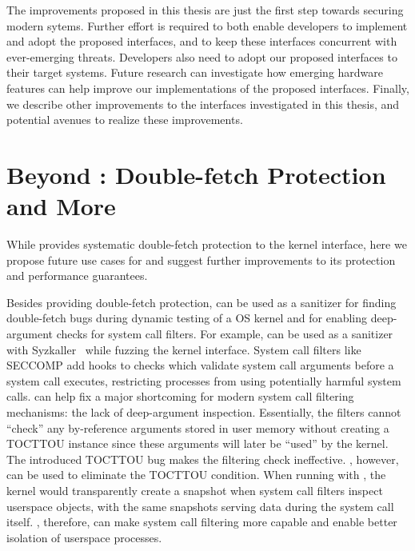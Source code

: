 The improvements proposed in this thesis are just the first step towards
securing modern sytems.
Further effort is required to both enable developers to implement and 
adopt the proposed interfaces, 
and to keep these interfaces concurrent with ever-emerging threats.
Developers also need to adopt our proposed interfaces to their target
systems.
Future research can investigate how emerging hardware features can help 
improve our implementations of the proposed interfaces.
Finally, we describe other improvements to the interfaces investigated
in this thesis, and potential avenues to realize these improvements.

\section{Beyond \midas: Double-fetch Protection and More}
\label{sec:conclusion:midas}
While \midas provides systematic double-fetch protection to the 
kernel interface,
here we propose future use cases for \midas and 
suggest further improvements to its protection and performance 
guarantees.

Besides providing double-fetch protection, \midas can be used as a 
sanitizer for finding double-fetch bugs during dynamic testing of a
OS kernel and for enabling deep-argument checks for system call filters.
For example, \midas can be used as a sanitizer with 
Syzkaller~\cite{vyukov2019syzkaller} while fuzzing the kernel interface.
System call filters like SECCOMP add hooks to checks which validate
system call arguments before a system call executes, 
restricting processes from using potentially harmful system calls.
\midas can help fix a major shortcoming for modern system call
filtering mechanisms: the lack of deep-argument inspection.
Essentially, the filters cannot ``check'' any by-reference arguments stored
in user memory without creating a TOCTTOU instance since these arguments
will later be ``used'' by the kernel.
The introduced TOCTTOU bug makes the filtering check ineffective.
\midas, however, can be used to eliminate the TOCTTOU condition.
When running with \midas, the kernel would transparently create a snapshot 
when system call filters inspect userspace objects, with the same
snapshots serving data during the system call itself.
\midas, therefore, can make system call filtering more capable and
enable better isolation of userspace processes.

